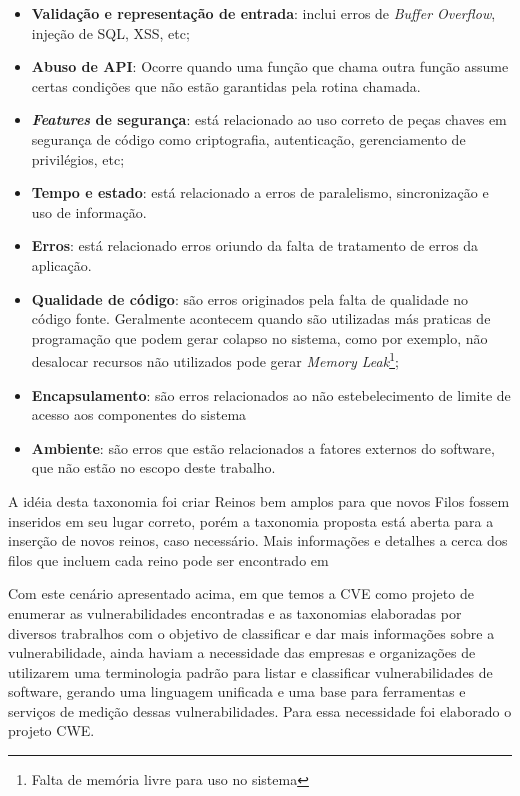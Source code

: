 \begin{itemize}
\item \textbf{Validação e representação de entrada}: inclui erros de \emph{Buffer Overflow}, injeção de SQL, XSS, etc;
\item \textbf{Abuso de API}: Ocorre quando uma função que chama outra função assume certas condições que não estão garantidas pela rotina chamada.
\item \textbf{\emph{Features} de segurança}: está relacionado ao uso correto de peças chaves em segurança de código como criptografia, autenticação, gerenciamento de privilégios, etc;
\item \textbf{Tempo e estado}: está relacionado a erros de paralelismo, sincronização e uso de informação.
\item \textbf{Erros}: está relacionado erros oriundo da falta de tratamento de erros da aplicação.
\item \textbf{Qualidade de código}: são erros originados pela falta de qualidade no código fonte. Geralmente acontecem quando são utilizadas más praticas de programação que podem gerar colapso no sistema, como por exemplo, não desalocar recursos não utilizados pode gerar \emph{Memory Leak}\footnote{Falta de memória livre para uso no sistema};
\item \textbf{Encapsulamento}: são erros relacionados ao não estebelecimento de limite de acesso aos componentes do sistema
\item \textbf{Ambiente}: são erros que estão relacionados a fatores externos do software, que não estão no escopo deste trabalho.

\end{itemize}

A idéia desta taxonomia foi criar Reinos bem amplos para que novos Filos fossem inseridos em seu lugar correto, porém a taxonomia proposta está aberta para a inserção de novos reinos, caso necessário. Mais informações e detalhes a cerca dos filos que incluem cada reino pode ser encontrado em \cite{tsipenyuk2005}

%
Com este cenário apresentado acima, em que temos a CVE como projeto de enumerar as vulnerabilidades encontradas e as taxonomias elaboradas por diversos trabralhos com o objetivo de classificar e dar mais informações sobre a vulnerabilidade, ainda haviam a necessidade das empresas e organizações de utilizarem  uma terminologia padrão para listar e classificar vulnerabilidades de software, gerando uma linguagem unificada e uma base para ferramentas e serviços de medição dessas vulnerabilidades. Para essa necessidade foi elaborado o projeto CWE.

